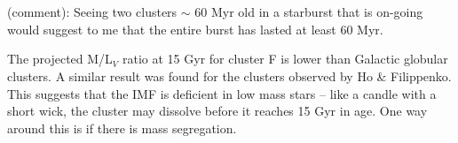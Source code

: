 \bigskip

\\
\\

 (comment): Seeing two clusters $\sim$ 60 Myr
old in a starburst that is on-going would suggest to me that the
entire burst has lasted at least 60 Myr.

The projected M/L$_V$ ratio at 15 Gyr for cluster F is lower than Galactic
globular clusters. A similar result was found for the clusters observed
by Ho \& Filippenko. This suggests that the IMF is deficient in low mass
stars -- like a candle with a short wick, the cluster may dissolve before
it reaches 15 Gyr in age. One way around this is if there is mass
segregation.






